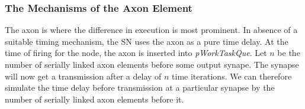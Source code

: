 	
		

	

		\subsubsection{The Mechanisms of the Axon Element}
		The axon is where the difference in execution is most prominent.
		In absence of a suitable timing mechanism, the SN uses the axon as a pure time delay.
		At the time of firing for the node, the axon is inserted into \emph{pWorkTaskQue}.
		Let $n$ be the number of serially linked axon elements before some output synape.
		The synapse will now get a transmission after a delay of $n$ time iterations.
		We can therefore simulate the time delay before transmission at a particular synapse by the number of serially linked axon elements before it.

